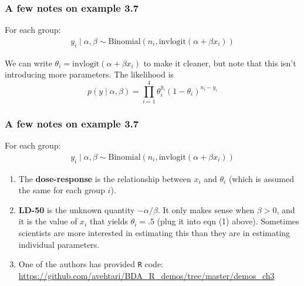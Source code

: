 \documentclass{beamer}
\begin{document}
\begin{frame}[fragile]
\frametitle{A few notes on example 3.7}

For each group:
\begin{gather*}
y_i \mid \alpha, \beta \sim \text{Binomial}(n_i, \text{invlogit}(\alpha + \beta x_i))
\end{gather*}

We can write $\theta_i = \text{invlogit}(\alpha + \beta x_i)$ to make it cleaner, but note that this isn't introducing more parameters. The likelihood is
$$
p(y \mid \alpha, \beta) = \prod_{i=1}^4 \theta_i^{y_i}(1-\theta_i)^{n_i-y_i}
$$


\end{frame}

\begin{frame}[fragile]
\frametitle{A few notes on example 3.7}

For each group:
\begin{gather}
y_i \mid \alpha, \beta \sim \text{Binomial}(n_i, \text{invlogit}(\alpha + \beta x_i))
\end{gather}


\begin{enumerate}
\item The {\bf dose-response} is the relationship between $x_i$ and $\theta_i$ (which is assumed the same for each group $i$).
\item {\bf LD-50} is the unknown quantity $-\alpha/\beta$. It only makes sense when $\beta > 0$, and it is the value of $x_i$ that yields $\theta_i = .5$ (plug it into eqn (1) above). Sometimes scientists are more interested in estimating this than they are in estimating individual parameters.
\item One of the authors has provided \verb|R| code: \url{https://github.com/avehtari/BDA_R_demos/tree/master/demos_ch3}
\end{enumerate}

\end{frame}
\end{document}
